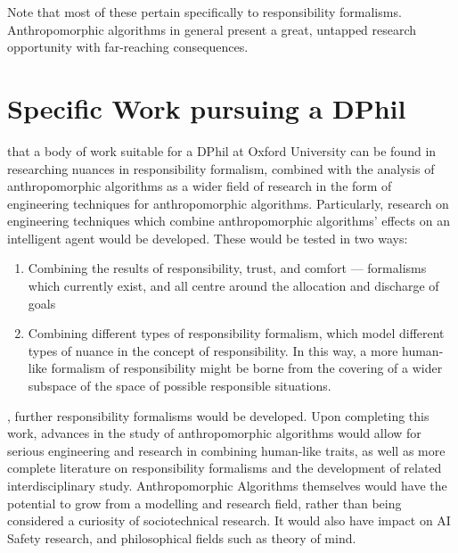 Note that most of these pertain specifically to responsibility formalisms. Anthropomorphic algorithms in general present a great, untapped research opportunity with far-reaching consequences.\par

\section{Specific Work pursuing a DPhil}
 that a body of work suitable for a DPhil at Oxford University can be found in researching nuances in responsibility formalism, combined with the analysis of anthropomorphic algorithms as a wider field of research in the form of engineering techniques for anthropomorphic algorithms. Particularly, research on engineering techniques which combine anthropomorphic algorithms' effects on an intelligent agent would be developed. These would be tested in two ways:

\begin{enumerate}
    \item Combining the results of responsibility, trust, and comfort --- formalisms which currently exist, and all centre around the allocation and discharge of goals
    \item Combining different types of responsibility formalism, which model different types of nuance in the concept of responsibility. In this way, a more human-like formalism of responsibility might be borne from the covering of a wider subspace of the space of possible responsible situations.
\end{enumerate}

, further responsibility formalisms would be developed. Upon completing this work, advances in the study of anthropomorphic algorithms would allow for serious engineering and research in combining human-like traits, as well as more complete literature on responsibility formalisms and the development of related interdisciplinary study. Anthropomorphic Algorithms themselves would have the potential to grow from a modelling and research field, rather than being considered a curiosity of sociotechnical research. It would also have impact on AI Safety research, and philosophical fields such as theory of mind.\par

